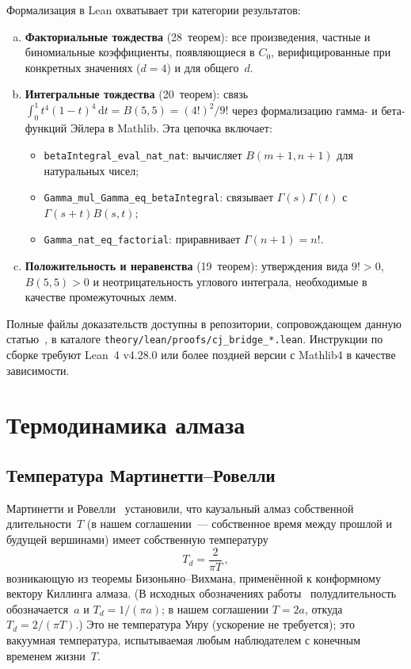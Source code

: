 \documentclass[12pt,a4paper]{article}
\theoremstyle{plain}
\theoremstyle{definition}
\theoremstyle{remark}
\newcommand{\dd}{\mathrm{d}}
\begin{document}
Формализация в Lean охватывает три категории результатов:
\begin{enumerate}[(a)]
\item \textbf{Факториальные тождества} (28~теорем): все
  произведения, частные и биномиальные коэффициенты,
  появляющиеся в $C_0$, верифицированные при конкретных
  значениях ($d = 4$) и для общего~$d$.
\item \textbf{Интегральные тождества} (20~теорем): связь
  $\int_0^1 t^4(1-t)^4\,\dd t = B(5,5) = (4!)^2/9!$ через
  формализацию гамма- и бета-функций Эйлера в Mathlib.
  Эта цепочка включает:
  \begin{itemize}
  \item \texttt{betaIntegral\_eval\_nat\_nat}: вычисляет
    $B(m+1, n+1)$ для натуральных чисел;
  \item \texttt{Gamma\_mul\_Gamma\_eq\_betaIntegral}: связывает
    $\Gamma(s)\Gamma(t)$ с $\Gamma(s+t) B(s,t)$;
  \item \texttt{Gamma\_nat\_eq\_factorial}: приравнивает
    $\Gamma(n+1) = n!$.
  \end{itemize}
\item \textbf{Положительность и неравенства} (19~теорем):
  утверждения вида $9! > 0$, $B(5,5) > 0$ и неотрицательность
  углового интеграла, необходимые в качестве промежуточных
  лемм.
\end{enumerate}

Полные файлы доказательств доступны в репозитории,
сопровождающем данную статью~\cite{Alfyorov:2026repo}, в
каталоге
\texttt{theory/lean/proofs/cj\_bridge\_*.lean}.  Инструкции
по сборке требуют Lean~4 v4.28.0 или более поздней версии с
Mathlib4 в качестве зависимости.

\section{Термодинамика алмаза}
\label{sec:diamond}

\subsection{Температура Мартинетти--Ровелли}

Мартинетти и Ровелли~\cite{MartRov:2003} установили, что
каузальный алмаз собственной длительности~$T$ (в нашем
соглашении~--- собственное время между прошлой и будущей
вершинами) имеет собственную температуру
\begin{equation}\label{eq:diamond-temp}
  T_d = \frac{2}{\pi T}\,,
\end{equation}
возникающую из теоремы Бизоньяно--Вихмана, применённой к
конформному вектору Киллинга алмаза.  (В исходных обозначениях
работы~\cite{MartRov:2003} полудлительность обозначается~$a$
и $T_d = 1/(\pi a)$; в нашем соглашении $T = 2a$, откуда
$T_d = 2/(\pi T)$.)  Это не температура Унру (ускорение
не требуется); это вакуумная температура, испытываемая любым
наблюдателем с конечным временем жизни~$T$.
\end{document}
